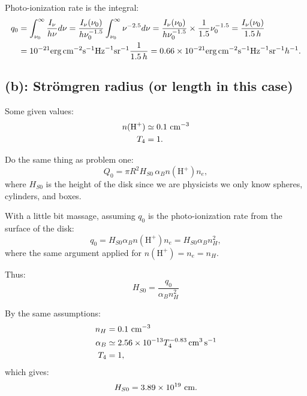 \documentclass[12pt,letterpaper]{article}
\newcommand{\cm}{\textrm{\,cm}}
\newcommand{\hdensity}{n(\textrm{H}^{+})}
\newcommand{\second}{\textrm{s}}
\newcommand{\Stroradius}{Str\"omgren radius}
\newcommand{\erg}{\textrm{erg}}
\newcommand{\sr}{\textrm{sr}}
\newcommand{\hz}{\textrm{Hz}}
\begin{document}
Photo-ionization rate is the integral:
\begin{equation}
    \begin{split}
        q_0 &= \int_{\nu_0}^{\infty} \frac{I_\nu}{h \nu} d\nu
        = \frac{I_\nu(\nu_0)}{h \nu_0^{-1.5}}
        \int_{\nu_0}^{\infty} 
        \nu^{-2.5} d\nu
        = \frac{I_\nu(\nu_0)}{h \nu_0^{-1.5}}
        \times \frac{1}{1.5} \nu_0^{-1.5} 
        = \frac{I_\nu(\nu_0)}{ 1.5 \,h }\\
        &= 10^{-21} \erg \cm^{-2} \second^{-1} \hz^{-1} \sr^{-1} \frac{1}{1.5\,h}
        = 0.66 \times 10^{-21}\erg \cm^{-2} \second^{-1} \hz^{-1} \sr^{-1} h^{-1}.
    \end{split}
\end{equation}


\subsection*{(b): {\Stroradius} (or length in this case)}

Some given values:
\begin{equation}
    \begin{split}
        \hdensity &\simeq 0.1\, \cm^{-3}\\
        T_4 &= 1.
    \end{split}
\end{equation}

Do the same thing as problem one:
\begin{equation}
    Q_0 = \pi R^2 H_{S0}\, \alpha_B \hdensity n_e,
\end{equation}
where $H_{S0}$ is the height of the disk since we are physicists we only know spheres, cylinders, and boxes.

With a little bit massage, assuming $q_0$ is the photo-ionization rate from the surface of the disk:
\begin{equation}
    q_0 = H_{S0} \alpha_B \hdensity n_e
    = H_{S0} \alpha_B n_{H}^2,
\end{equation}
where the same argument applied for $\hdensity = n_e = n_{H}$.

Thus:
\begin{equation}
    H_{S0} = \frac{q_0}{\alpha_B n_H^2}
\end{equation}

By the same assumptions:
\begin{equation*}
    \begin{split}
        n_H &= 0.1 \, \cm^{-3} \\
        \alpha_B &\simeq 2.56 \times 10^{-13} T_4^{-0.83} \cm^3 \, \second^{-1} \\
        T_4 &= 1, 
    \end{split}
\end{equation*}
which gives:
\begin{equation}
    H_{S0} = 3.89 \times 10^{19} \, \cm.
\end{equation}
\end{document}
